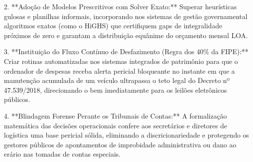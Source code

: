 \documentclass[10pt,a4paper,journal]{article}
\begin{document}
2. **Adoção de Modelos Prescritivos com Solver Exato:** Superar heurísticas gulosas e planilhas informais, incorporando nos sistemas de gestão governamental algoritmos exatos (como o HiGHS) que certifiquem gaps de integralidade próximos de zero e garantam a distribuição equânime do orçamento mensal LOA.

3. **Instituição do Fluxo Contínuo de Desfazimento (Regra dos 40\% da FIPE):** Criar rotinas automatizadas nos sistemas integrados de patrimônio para que o ordenador de despesas receba alerta pericial bloqueante no instante em que a manutenção acumulada de um veículo ultrapassa o teto legal do Decreto nº 47.539/2018, direcionando o bem imediatamente para os leilões eletrônicos públicos.

4. **Blindagem Forense Perante os Tribunais de Contas:** A formalização matemática das decisões operacionais confere aos secretários e diretores de logística uma base pericial sólida, eliminando a discricionariedade e protegendo os gestores públicos de apontamentos de improbidade administrativa ou dano ao erário nas tomadas de contas especiais.
\end{document}
